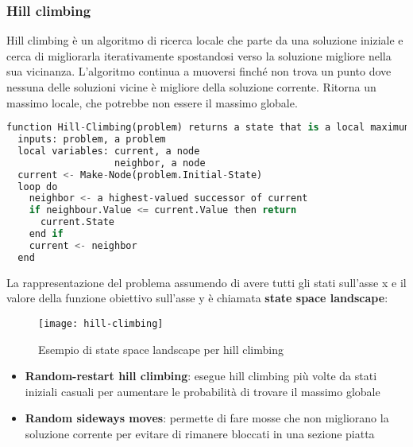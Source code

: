 \documentclass[a4paper]{article}
\begin{document}
\subsubsection{Hill climbing}
Hill climbing è un algoritmo di ricerca locale che parte da una soluzione iniziale
e cerca di migliorarla iterativamente spostandosi verso la soluzione migliore
nella sua vicinanza. L'algoritmo continua a muoversi finché non trova un punto
dove nessuna delle soluzioni vicine è migliore della soluzione corrente.
Ritorna un massimo locale, che potrebbe non essere il massimo globale.
\begin{lstlisting}[language=Python]
function Hill-Climbing(problem) returns a state that is a local maximum
  inputs: problem, a problem
  local variables: current, a node
                   neighbor, a node
  current <- Make-Node(problem.Initial-State)
  loop do
    neighbor <- a highest-valued successor of current
    if neighbour.Value <= current.Value then return
      current.State
    end if
    current <- neighbor
  end
\end{lstlisting}
La rappresentazione del problema assumendo di avere tutti gli stati sull'asse x
e il valore della funzione obiettivo sull'asse y è chiamata \textbf{state space landscape}:
\begin{figure}[H]
  \centering
  \texttt{[image: hill-climbing]}
  \caption{Esempio di state space landscape per hill climbing}
\end{figure}
\begin{itemize}
  \item \textbf{Random-restart hill climbing}: esegue hill climbing più volte
    da stati iniziali casuali per aumentare le probabilità di trovare il massimo globale
  \item \textbf{Random sideways moves}: permette di fare mosse che non migliorano
    la soluzione corrente per evitare di rimanere bloccati in una sezione piatta
\end{itemize}
\end{document}
